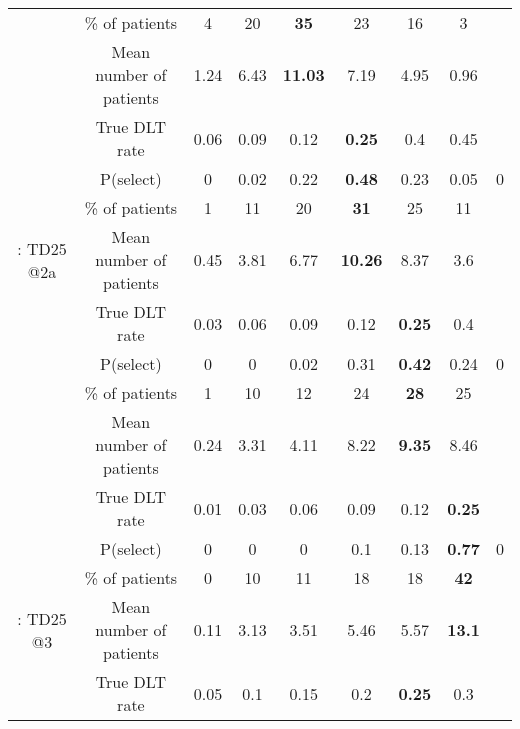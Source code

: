 \begin{table}[h!]
\begin{singlespace}
{\begin{tabular}[t]{ccccccccc}
				\rowcolor{gray!6}   & \% of patients & 4 & 20 & \textbf{35} & 23 & 16 & 3 & \\
				
				\rowcolor{gray!6}  \multirow{-4}{*}{\centering\arraybackslash 3: TD25 @1} & Mean number of patients & 1.24 & 6.43 & \textbf{11.03} & 7.19 & 4.95 & 0.96 & \\
				\cmidrule{1-9}
				& True DLT rate & 0.06 & 0.09 & 0.12 & \textbf{0.25} & 0.4 & 0.45 & \\
				
				& P(select) & 0 & 0.02 & 0.22 & \textbf{0.48} & 0.23 & 0.05 & 0\\
				
				& \% of patients & 1 & 11 & 20 & \textbf{31} & 25 & 11 & \\
				
				\multirow{-4}{*}{\centering\arraybackslash 4: TD25 @2a} & Mean number of patients & 0.45 & 3.81 & 6.77 & \textbf{10.26} & 8.37 & 3.6 & \\
				\cmidrule{1-9}
				\rowcolor{gray!6}   & True DLT rate & 0.03 & 0.06 & 0.09 & 0.12 & \textbf{0.25} & 0.4 & \\
				
				\rowcolor{gray!6}   & P(select) & 0 & 0 & 0.02 & 0.31 & \textbf{0.42} & 0.24 & 0\\
				
				\rowcolor{gray!6}   & \% of patients & 1 & 10 & 12 & 24 & \textbf{28} & 25 & \\
				
				\rowcolor{gray!6}  \multirow{-4}{*}{\centering\arraybackslash 5: TD25 @2b} & Mean number of patients & 0.24 & 3.31 & 4.11 & 8.22 & \textbf{9.35} & 8.46 & \\
				\cmidrule{1-9}
				& True DLT rate & 0.01 & 0.03 & 0.06 & 0.09 & 0.12 & \textbf{0.25} & \\
				
				& P(select) & 0 & 0 & 0 & 0.1 & 0.13 & \textbf{0.77} & 0\\
				
				& \% of patients & 0 & 10 & 11 & 18 & 18 & \textbf{42} & \\
				
				\multirow{-4}{*}{\centering\arraybackslash 6: TD25 @3} & Mean number of patients & 0.11 & 3.13 & 3.51 & 5.46 & 5.57 & \textbf{13.1} & \\
				\cmidrule{1-9}
				\rowcolor{gray!6}   & True DLT rate & 0.05 & 0.1 & 0.15 & 0.2 & \textbf{0.25} & 0.3 & \\
				

\end{tabular}}
\end{singlespace}
\end{table}
